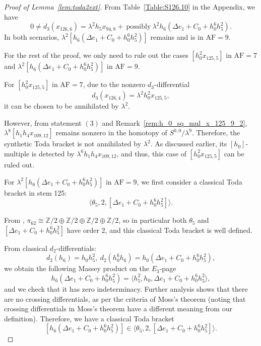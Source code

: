 \documentclass{amsart}
\numberwithin{equation}{section}
\newcommand{\AF}{\mathrm{AF}}
\begin{document}
\begin{proof}[Proof of Lemma~\ref{lem:toda2ext}]

From Table~\ref{Table:S126.10} in the Appendix, we have
$$0 \neq d_3(x_{126,6}) = \lambda^2 h_5 x_{94,8} + \ \text{possibly} \ \lambda^2 h_6(\Delta e_1 +C_0+h_0^6h_5^2).$$ 
In both scenarios, $\lambda^2 [h_6(\Delta e_1 +C_0+h_0^6h_5^2)]$ remains and is in $\AF=9$.

For the rest of the proof, we only need to rule out the cases $[h_0^2 x_{125,5}]$ in $\AF=7$ and $\lambda^2 [h_6(\Delta e_1 +C_0+h_0^6h_5^2)]$ in $\AF=9$. 

For $[h_0^2 x_{125,5}]$ in $\AF=7$, due to the nonzero $d_3$-differential
$$d_3(x_{126,4}) = \lambda^2 h_0^2 x_{125,5},$$
it can be chosen to be annihilated by $\lambda^2$. 

However, from statement $(3)$ and Remark~\ref{rem:h_0_sq_mul_x_125_9_2}, $\lambda^8 [h_1h_4x_{109,12}]$ remains nonzero in the homotopy of $S^{0,0}/\lambda^9$. Therefore, the synthetic Toda bracket is not annihilated by $\lambda^2$. As discussed earlier, its $[h_0]$-multiple is detected by $\lambda^6 h_1h_4x_{109,12}$, and thus, this case of $[h_0^2 x_{125,5}]$ can be ruled out.



For $\lambda^2 [h_6(\Delta e_1 +C_0+h_0^6h_5^2)]$ in $\AF=9$, we first consider a classical Toda bracket in stem 125:
$$\langle \theta_5, 2, [\Delta e_1 +C_0+h_0^6h_5^2] \rangle.$$

From \cite{Xu, IWX}, $\pi_{62} \cong \mathbb{Z}/2 \oplus \mathbb{Z}/2 \oplus \mathbb{Z}/2 \oplus \mathbb{Z}/2$, so in particular both $\theta_5$ and $[\Delta e_1 +C_0+h_0^6h_5^2]$ have order 2, and this classical Toda bracket is well defined.

From classical $d_2$-differentials:
$$d_2(h_6) = h_0h_5^2, \ d_2(h_0^6h_6)= h_0(\Delta e_1 +C_0+h_0^6h_5^2),$$
we obtain the following Massey product on the $E_3$-page
$$h_6(\Delta e_1 +C_0+h_0^6h_5^2) = \langle h_5^2, h_0, \Delta e_1 +C_0+h_0^6h_5^2 \rangle,$$
and we check that it has zero indeterminacy. Further analysis shows that there are no crossing differentials, as per the criteria of Moss's theorem \cite[Theorem~1.2]{Moss} (noting that crossing differentials in Moss's theorem have a different meaning from our definition). Therefore, we have a classical Toda bracket 
$$[h_6(\Delta e_1 +C_0+h_0^6h_5^2)] \in \langle \theta_5, 2, [\Delta e_1 +C_0+h_0^6h_5^2] \rangle.$$


\end{proof}
\end{document}
